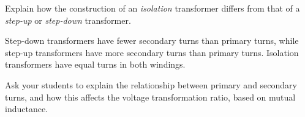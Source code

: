 

Explain how the construction of an {\it isolation} transformer differs from that of a {\it step-up} or {\it step-down} transformer.







Step-down transformers have fewer secondary turns than primary turns, while step-up transformers have more secondary turns than primary turns.  Isolation transformers have equal turns in both windings.







Ask your students to explain the relationship between primary and secondary turns, and how this affects the voltage transformation ratio, based on mutual inductance.




